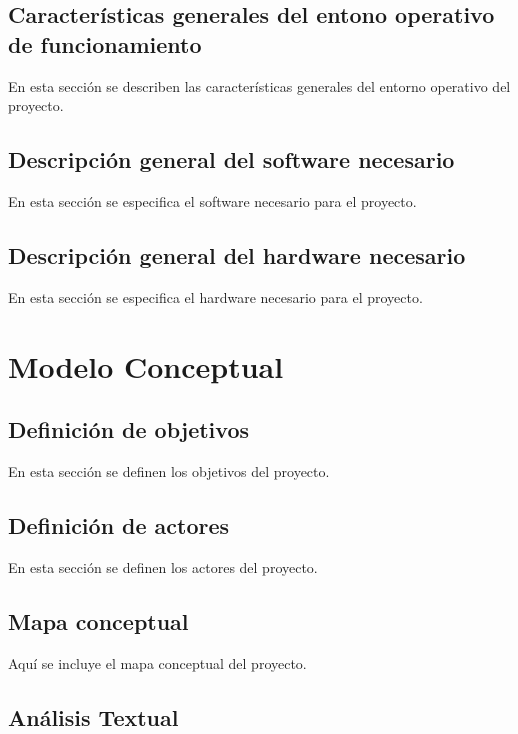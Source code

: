 \subsection{\textbf{Características generales del entono operativo de funcionamiento}}

En esta sección se describen las características generales del entorno operativo del proyecto.

\subsection{\textbf{Descripción general del software necesario}}

En esta sección se especifica el software necesario para el proyecto.

\subsection{\textbf{Descripción general del hardware necesario}}

En esta sección se especifica el hardware necesario para el proyecto.

\section{\textbf{Modelo Conceptual}}

\subsection{\textbf{Definición de objetivos}}

En esta sección se definen los objetivos del proyecto.

\subsection{\textbf{Definición de actores}}

En esta sección se definen los actores del proyecto.

\subsection{\textbf{Mapa conceptual}}

Aquí se incluye el mapa conceptual del proyecto.

\subsection{\textbf{Análisis Textual}}


